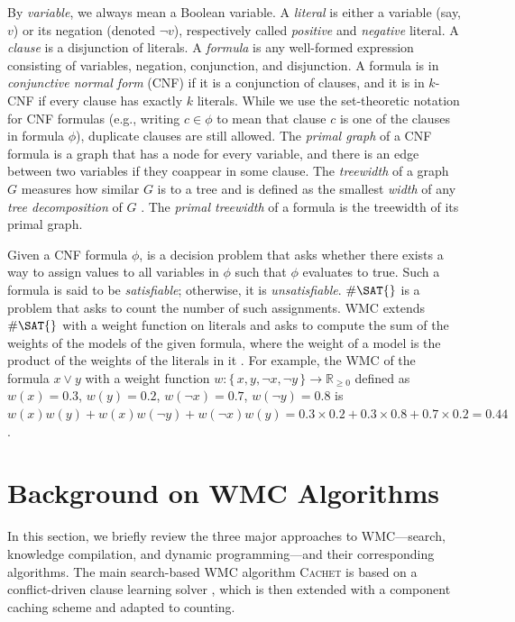 
By \emph{variable}, we always mean a Boolean variable. A \emph{literal} is
either a variable (say, $v$) or its negation (denoted $\neg v$), respectively
called \emph{positive} and \emph{negative} literal. A \emph{clause} is a
disjunction of literals. A \emph{formula} is any well-formed expression
consisting of variables, negation, conjunction, and disjunction. A formula is in
\emph{conjunctive normal form} (CNF) if it is a conjunction of clauses, and it
is in $k$-CNF if every clause has exactly $k$ literals. While we use the
set-theoretic notation for CNF formulas (e.g., writing $c \in \phi$ to mean that
clause $c$ is one of the clauses in formula $\phi$), duplicate clauses are still
allowed. The \emph{primal graph} of a CNF formula is a graph that has a node for
every variable, and there is an edge between two variables if they coappear in
some clause. The \emph{treewidth} of a graph $G$ measures how similar $G$
is to a tree and is defined as the smallest \emph{width} of any \emph{tree
  decomposition} of $G$ \citep{DBLP:journals/jct/RobertsonS84}. The \emph{primal
  treewidth} of a formula is the treewidth of its primal graph.

Given a CNF formula $\phi$, \SAT{} is a decision problem that asks whether there
exists a way to assign values to all variables in $\phi$ such that $\phi$
evaluates to true. Such a formula is said to be \emph{satisfiable}; otherwise,
it is \emph{unsatisfiable}. $\#\SAT{}$ is a problem that asks to count the
number of such assignments. \textsf{WMC} extends $\#\SAT{}$ with a weight
function on literals and asks to compute the sum of the weights of the models of
the given formula, where the weight of a model is the product of the weights of
the literals in it \citep{DBLP:journals/ai/ChaviraD08}. For example, the
\textsf{WMC} of the formula $x \lor y$ with a weight function $w\colon \{\,x, y,
\neg x, \neg y\,\} \to \mathbb{R}_{\ge 0}$ defined as $w(x) = 0.3$, $w(y) = 0.2$,
$w(\neg x) = 0.7$, $w(\neg y) = 0.8$ is $w(x)w(y)+w(x)w(\neg y)+w(\neg x)w(y) =
0.3 \times 0.2 + 0.3 \times 0.8 + 0.7 \times 0.2 = 0.44$.

\section{Background on \textsf{\textmd{WMC}} Algorithms}\label{sec:background}

In this section, we briefly review the three major approaches to \textsf{WMC}---search, knowledge compilation, and dynamic programming---and their corresponding algorithms. The main search-based \textsf{WMC} algorithm \textsc{Cachet} \citep{DBLP:conf/sat/SangBBKP04} is based on a conflict-driven clause learning \SAT{} solver \citep{DBLP:conf/dac/MoskewiczMZZM01}, which is then extended with a component caching scheme and adapted to counting.

